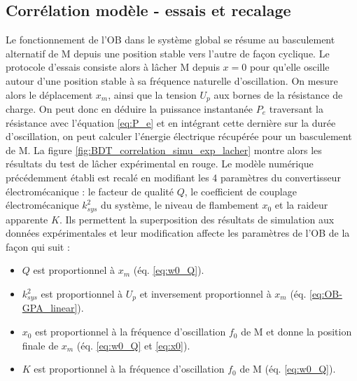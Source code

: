 	\subsection{Corrélation modèle - essais et recalage}
Le fonctionnement de l'OB dans le système global se résume au basculement alternatif de M depuis une position stable vers l'autre de façon cyclique. Le protocole d'essais consiste alors à lâcher M depuis $x=0$ pour qu'elle oscille autour d'une position stable à sa fréquence naturelle d'oscillation. On mesure alors le déplacement $x_m$, ainsi que la tension $U_p$ aux bornes de la résistance de charge. On peut donc en déduire la puissance instantanée $P_e$ traversant la résistance avec l'équation \ref{eq:P_e} et en intégrant cette dernière sur la durée d'oscillation, on peut calculer l'énergie électrique récupérée pour un basculement de M. La figure \ref{fig:BDT_correlation_simu_exp_lacher} montre alors les résultats du test de lâcher expérimental en rouge. Le modèle numérique précédemment établi est recalé en modifiant les 4 paramètres du convertisseur électromécanique : le facteur de qualité $Q$, le coefficient de couplage électromécanique $k_{sys}^2$ du système, le niveau de flambement $x_0$ et la raideur apparente $K$. Ils permettent la superposition des résultats de simulation aux données expérimentales et leur modification affecte les paramètres de l'OB de la façon qui suit :
\begin{itemize}[label=$\circ$]
	\item $Q$ est proportionnel à $x_m$ (éq. \ref{eq:w0_Q}).
	\item $k_{sys}^2$ est proportionnel à $U_p$ et inversement proportionnel à $x_m$ (éq. \ref{eq:OB-GPA_linear}).
	\item $x_0$ est proportionnel à la fréquence d'oscillation $f_0$ de M et donne la position finale de $x_m$ (éq. \ref{eq:w0_Q} et \ref{eq:x0}).
	\item $K$ est proportionnel à la fréquence d'oscillation $f_0$ de M (éq. \ref{eq:w0_Q}).
\end{itemize}

